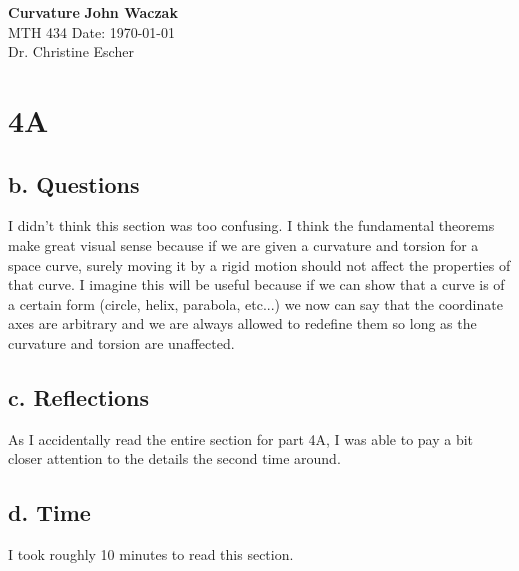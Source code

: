 \documentclass[a4paper, 11pt]{article}
\begin{document}
\noindent
\large\textbf{Curvature} \hfill \textbf{John Waczak} \\
\normalsize MTH 434 \hfill  Date: \today \\
Dr. Christine Escher \\

\section*{4A}
	\subsection*{b. Questions}
	I didn't think this section was too confusing. I think the fundamental theorems make great visual sense because if we are given a curvature and torsion for a space curve, surely moving it by a rigid motion should not affect the properties of that curve. I imagine this will be useful because if we can show that a curve is of a certain form (circle, helix, parabola, etc...) we now can say that the coordinate axes are arbitrary and we are always allowed to redefine them so long as the curvature and torsion are unaffected. 
	\subsection*{c. Reflections}
	As I accidentally read the entire section for part 4A, I was able to pay a bit closer attention to the details the second time around. 
	
	\subsection*{d. Time}
	I took roughly 10 minutes to read this section. 
\end{document}
